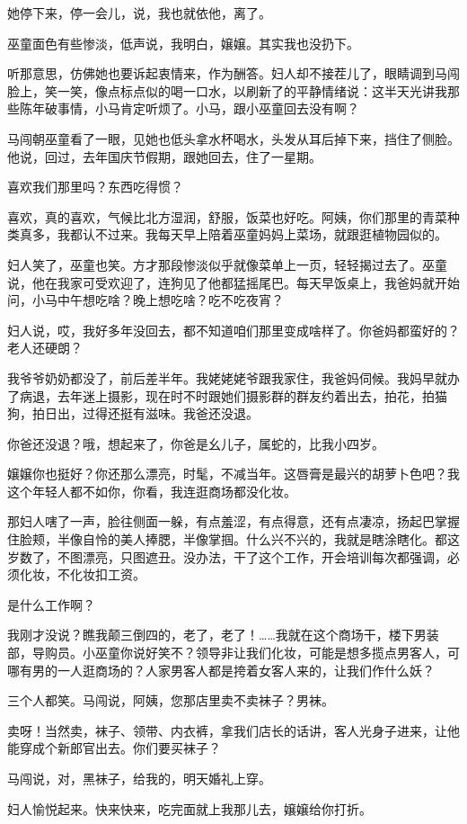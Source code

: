 \documentclass[lang=cn,newtx,12pt,scheme=chinese]{elegantbook}
\begin{document}
她停下来，停一会儿，说，我也就依他，离了。

巫童面色有些惨淡，低声说，我明白，嬢嬢。其实我也没扔下。

听那意思，仿佛她也要诉起衷情来，作为酬答。妇人却不接茬儿了，眼睛调到马闯脸上，笑一笑，像点标点似的喝一口水，以刷新了的平静情绪说：这半天光讲我那些陈年破事情，小马肯定听烦了。小马，跟小巫童回去没有啊？

马闯朝巫童看了一眼，见她也低头拿水杯喝水，头发从耳后掉下来，挡住了侧脸。他说，回过，去年国庆节假期，跟她回去，住了一星期。

喜欢我们那里吗？东西吃得惯？

喜欢，真的喜欢，气候比北方湿润，舒服，饭菜也好吃。阿姨，你们那里的青菜种类真多，我都认不过来。我每天早上陪着巫童妈妈上菜场，就跟逛植物园似的。

妇人笑了，巫童也笑。方才那段惨淡似乎就像菜单上一页，轻轻揭过去了。巫童说，他在我家可受欢迎了，连狗见了他都猛摇尾巴。每天早饭桌上，我爸妈就开始问，小马中午想吃啥？晚上想吃啥？吃不吃夜宵？

妇人说，哎，我好多年没回去，都不知道咱们那里变成啥样了。你爸妈都蛮好的？老人还硬朗？

我爷爷奶奶都没了，前后差半年。我姥姥姥爷跟我家住，我爸妈伺候。我妈早就办了病退，去年迷上摄影，现在时不时跟她们摄影群的群友约着出去，拍花，拍猫狗，拍日出，过得还挺有滋味。我爸还没退。

你爸还没退？哦，想起来了，你爸是幺儿子，属蛇的，比我小四岁。

嬢嬢你也挺好？你还那么漂亮，时髦，不减当年。这唇膏是最兴的胡萝卜色吧？我这个年轻人都不如你，你看，我连逛商场都没化妆。

那妇人嗐了一声，脸往侧面一躲，有点羞涩，有点得意，还有点凄凉，扬起巴掌握住脸颊，半像自怜的美人捧腮，半像掌掴。什么兴不兴的，我就是瞎涂瞎化。都这岁数了，不图漂亮，只图遮丑。没办法，干了这个工作，开会培训每次都强调，必须化妆，不化妆扣工资。

是什么工作啊？

我刚才没说？瞧我颠三倒四的，老了，老了！……我就在这个商场干，楼下男装部，导购员。小巫童你说好笑不？领导非让我们化妆，可能是想多揽点男客人，可哪有男的一人逛商场的？人家男客人都是挎着女客人来的，让我们作什么妖？

三个人都笑。马闯说，阿姨，您那店里卖不卖袜子？男袜。

卖呀！当然卖，袜子、领带、内衣裤，拿我们店长的话讲，客人光身子进来，让他能穿成个新郎官出去。你们要买袜子？

马闯说，对，黑袜子，给我的，明天婚礼上穿。

妇人愉悦起来。快来快来，吃完面就上我那儿去，嬢嬢给你打折。
\end{document}
